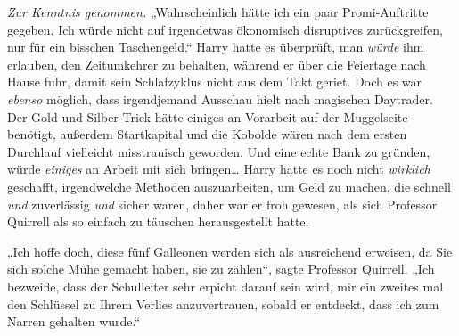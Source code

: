 \emph{Zur Kenntnis genommen.} „Wahrscheinlich hätte ich ein paar Promi-Auftritte gegeben. Ich würde nicht auf irgendetwas ökonomisch disruptives zurückgreifen, nur für ein bisschen Taschengeld.“ Harry hatte es überprüft, man \emph{würde} ihm erlauben, den Zeitumkehrer zu behalten, während er über die Feiertage nach Hause fuhr, damit sein Schlafzyklus nicht aus dem Takt geriet. Doch es war \emph{ebenso} möglich, dass irgendjemand Ausschau hielt nach magischen Daytrader.
Der Gold-und-Silber-Trick hätte einiges an Vorarbeit auf der Muggelseite benötigt, außerdem Startkapital und die Kobolde wären nach dem ersten Durchlauf vielleicht misstrauisch geworden. Und eine echte Bank zu gründen, würde \emph{einiges} an Arbeit mit sich bringen… Harry hatte es noch nicht \emph{wirklich} geschafft, irgendwelche Methoden auszuarbeiten, um Geld zu machen, die schnell \emph{und} zuverlässig \emph{und} sicher waren, daher war er froh gewesen, als sich Professor Quirrell als so einfach zu täuschen herausgestellt hatte.

„Ich hoffe doch, diese fünf Galleonen werden sich als ausreichend erweisen, da Sie sich solche Mühe gemacht haben, sie zu zählen“, sagte Professor Quirrell. „Ich bezweifle, dass der Schulleiter sehr erpicht darauf sein wird, mir ein zweites mal den Schlüssel zu Ihrem Verlies anzuvertrauen, sobald er entdeckt, dass ich zum Narren gehalten wurde.“

